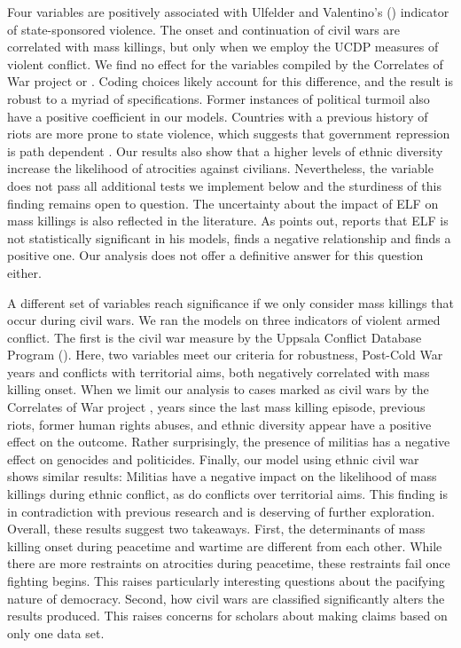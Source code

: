 Four variables are positively associated with Ulfelder and Valentino's (\citeyear{ulfelder2008assessing}) indicator of state-sponsored violence. The onset and continuation of civil wars are correlated with mass killings, but only when we employ the UCDP measures of violent conflict. We find no effect for the variables compiled by the Correlates of War project or \cite{cederman2010ethnic}. Coding choices likely account for this difference, and the result is robust to a myriad of specifications. Former instances of political turmoil also have a positive coefficient in our models. Countries with a previous history of riots are more prone to state violence, which suggests that government repression is path dependent 
\citep[e.g.,][]{gurr2000peoples,harff2003no,krain1997state,nyseth2017re}. Our results also show that a higher levels of ethnic diversity increase the likelihood of atrocities against civilians. Nevertheless, the variable does not pass all additional tests we implement below and the sturdiness of this finding remains open to question. The uncertainty about the impact of ELF on mass killings is also reflected in the literature. As \citet[237]{hoeffler2016development} points out, \citet{rummel1995democracy} reports that ELF is not statistically significant in his models, \citet{wood2014opportunities} finds a negative relationship and \citet{querido2009state} finds a positive one. Our analysis does not offer a definitive answer for this question either.

A different set of variables reach significance if we only consider mass killings that occur during civil wars. We ran the models on three indicators of violent armed conflict. The first is the civil war measure by the Uppsala Conflict Database Program  (\citeyear{allansson2017organized,gleditsch2002armed}). Here, two variables meet our criteria for robustness, Post-Cold War years and conflicts with territorial aims, both negatively correlated with mass killing onset. When we limit our analysis to cases marked as civil wars by the Correlates of War project \citep{sarkees2010resort}, years since the last mass killing episode, previous riots, former human rights abuses, and ethnic diversity appear have a positive effect on the outcome. Rather surprisingly, the presence of militias has a negative effect on genocides and politicides. Finally, our model using ethnic civil war \citep{cederman2010ethnic} shows similar results: Militias have a negative impact on the likelihood of mass killings during ethnic conflict, as do conflicts over territorial aims. This finding is in contradiction with previous research \citep{koren2017means} and is deserving of further exploration. Overall, these results suggest two takeaways. First, the determinants of mass killing onset during peacetime and wartime are different from each other. While there are more restraints on atrocities during peacetime, these restraints fail once fighting begins. This raises particularly interesting questions about the pacifying nature of democracy. Second, how civil wars are classified significantly alters the results produced. This raises concerns for scholars about making claims based on only one data set.

